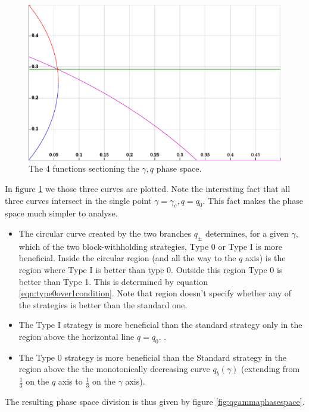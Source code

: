 \documentclass[letterpaper,12pt]{report}
\theoremstyle{plain}
\theoremstyle{definition}
\begin{document}
\begin{figure}[fourfunctions]
\centering
\includegraphics[width=150mm]{intersection4.pdf}
\caption{The 4 functions sectioning the $\gamma, q$ phase space.}
\label{fig:fourfunctions}
\end{figure}

In figure \ref{fig:fourfunctions} we those three curves are plotted.
Note the interesting fact that all three curves intersect in the single point $\gamma=\gamma_c, q=q_0$.
This fact makes the phase space much simpler to analyse.

\newpage

\begin{itemize}
\item The circular curve created by the two branches $q_{\pm}$ determines, for a given $\gamma$, which of the two block-withholding strategies, Type 0 or Type I is more beneficial. Inside the circular region (and all the way to the $q$ axis) is the region where Type I is better than type 0. Outside this region Type 0 is better than Type 1. This is determined by equation \ref{eqn:type0over1condition}. Note that region doesn't specify whether any of the strategies is better than the standard one.
\item The Type I strategy is more beneficial than the standard strategy only in the region above the horizontal line $q=q_0$. .
\item The Type 0 strategy is more beneficial than the Standard strategy in the region above the the monotonically decreasing curve $q_b(\gamma)$ (extending from $\frac{1}{3}$ on the $q$ axis to $\frac{1}{3}$ on the $\gamma$ axis).
\end{itemize}

The resulting phase space division is thus given by figure \ref{fig:qgammaphasespace}.
\end{document}
